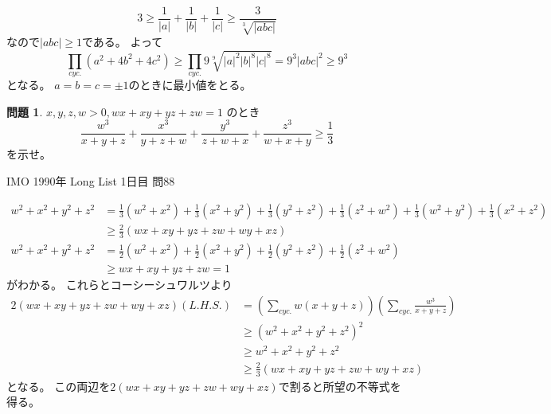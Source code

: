 \documentclass[uplatex, a5paper]{jsarticle}
\makeatletter
\theoremstyle{definition}
\newtheorem{prob}{問題}
\renewenvironment{proof}[1][\proofname]{
  \pushQED{\qed}%
  \normalfont \topsep6\p@\@plus6\p@\relax
  \trivlist
  \item[\hskip\labelsep
    #1\@addpunct{\textbf{.}}]\ignorespaces
}{%
  \popQED\endtrivlist\@endpefalse
}
\providecommand{\proofname}{証明}
\newcommand{\lhs }{ L.H.S. }
\def\qed{\hfill $\Box$}
\makeatother
\begin{document}
\begin{proof}
  \[
  3 \geq \displaystyle\frac{1}{|a|} + \frac{1}{|b|} + \frac{1}{|c|}
  \geq \displaystyle\frac{3}{\sqrt[3]{|abc|}}
  \]
  なので\(|abc| \geq 1\)である。
  よって
  \[
  \prod_{cyc.}(a^2+4b^2+4c^2) \geq \prod_{cyc.}9\sqrt[9]{|a|^2|b|^8|c|^8} = 9^3 |abc|^2 \geq 9^3
  \]
  となる。
  \(a=b=c=\pm 1\)のときに最小値をとる。
\end{proof}










\newpage

\begin{prob}
  \(x,y,z,w > 0 , wx+xy+yz+zw=1\)
  のとき
  \[
  \frac{w^3}{x+y+z} + \frac{x^3}{y+z+w} + \frac{y^3}{z+w+x} + \frac{z^3}{w+x+y} \geq \frac{1}{3}
  \]
  を示せ。
  \begin{flushright}
    IMO 1990年 Long List 1日目 問88
  \end{flushright}
\end{prob}


\begin{proof}
  \begin{align*}
    w^2+x^2+y^2+z^2
    &= \frac{1}{3}(w^2+x^2)
    + \frac{1}{3}(x^2+y^2)
    + \frac{1}{3}(y^2+z^2)
    + \frac{1}{3}(z^2+w^2)
    + \frac{1}{3}(w^2+y^2)
    + \frac{1}{3}(x^2+z^2) \\
    &\geq \frac{2}{3}(wx+xy+yz+zw+wy+xz) \\
    w^2+x^2+y^2+z^2
    &= \frac{1}{2}(w^2+x^2) + \frac{1}{2}(x^2+y^2) + \frac{1}{2}(y^2+z^2) + \frac{1}{2}(z^2+w^2) \\
    &\geq wx+xy+yz+zw = 1
  \end{align*}
  がわかる。
  これらとコーシーシュワルツより
  \begin{align*}
    2(wx+xy+yz+zw+wy+xz)( \lhs )
    &= \left( \sum_{cyc.} w(x+y+z) \right) \left( \sum_{cyc.}\frac{w^3}{x+y+z} \right) \\
    &\geq \left( w^2+x^2+y^2+z^2 \right) ^2 \\
    &\geq w^2+x^2+y^2+z^2 \\
    &\geq \frac{2}{3}(wx+xy+yz+zw+wy+xz)
  \end{align*}
  となる。
  この両辺を\(2(wx+xy+yz+zw+wy+xz)\)で割ると所望の不等式を得る。
\end{proof}
\end{document}
